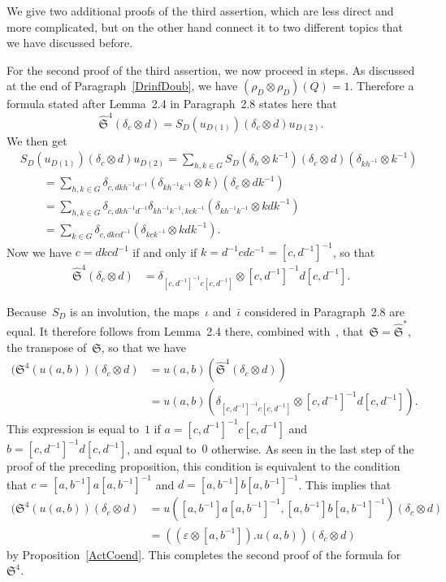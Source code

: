 \documentclass[12pt]{article}
\theoremstyle{definition}
\theoremstyle{break}
\newcommand{\fS}{\mathfrak{S}}
\newcommand{\hS}{\hat{\mathfrak{S}}}
\renewcommand{\1}{\mathbbm{1}}
\newcommand{\ot}{\mathbin{\otimes}}
\newcommand{\uu}{u}
\begin{document}
We give two additional proofs of the third assertion, which are less direct and more complicated, but on the other hand connect it to two different topics that we have discussed before.
\begin{parlist}
\item
For the second proof of the third assertion, we now proceed in steps. As discussed at the end of Paragraph~\ref{DrinfDoub}, we have $(\rho_D \ot \rho_D)(Q) = 1$. Therefore a formula stated after Lemma~2.4 in Paragraph~2.8 states here that
\[\hS^4(\delta_c \ot d) = S_D(u_{D (1)}) (\delta_c \ot d) u_{D (2)}.\]
We then get
\begin{align*}
&S_D(u_{D (1)}) (\delta_c \ot d) u_{D (2)}
= \sum_{h,k \in G} S_D(\delta_{h} \ot k^{-1}) (\delta_c \ot d) (\delta_{k h^{-1}} \ot k^{-1})  \\
&\qquad = \sum_{h,k \in G} \delta_{c, d k h^{-1} d^{-1}} (\delta_{k h^{-1} k^{-1}} \ot k) (\delta_{c} \ot d k^{-1}) \\
&\qquad = \sum_{h,k \in G} \delta_{c, d k h^{-1} d^{-1}} \delta_{k h^{-1} k^{-1}, k c k^{-1}}
(\delta_{k h^{-1} k^{-1}} \ot k d k^{-1}) \\
&\qquad = \sum_{k \in G} \delta_{c, d k c d^{-1}} (\delta_{k c k^{-1}} \ot k d k^{-1}).
\end{align*}
Now we have $c = d k c d^{-1}$ if and only if $k = d^{-1} c d c^{-1} = [c,d^{-1}]^{-1}$, so that
\begin{align*}
\hS^4(\delta_c \ot d)
&= \delta_{[c,d^{-1}]^{-1} c [c,d^{-1}]} \ot [c,d^{-1}]^{-1} d [c,d^{-1}].
\end{align*}

\item
Because~$S_D$ is an involution, the maps~$\iota$ and~$\bar{\iota}$ considered in Paragraph~2.8 are equal. It therefore follows from Lemma~2.4 there, combined with~\cite[Prop.~4.1, p.~35]{SZ}, that~$\fS = \hat{\fS}^*$, the transpose of~$\hat{\fS}$, so that we have
\begin{align*}
(\fS^4(\uu(a,b))(\delta_c \ot d) &= \uu(a,b)(\hat{\fS}^4(\delta_c \ot d)) \\
&= \uu(a,b)(\delta_{[c,d^{-1}]^{-1} c [c,d^{-1}]} \ot [c,d^{-1}]^{-1} d [c,d^{-1}]).
\end{align*}
This expression is equal to~$1$ if
$a = [c,d^{-1}]^{-1} c [c,d^{-1}]$ and $b = [c,d^{-1}]^{-1} d [c,d^{-1}]$, and equal to~$0$ otherwise. As seen in the last step of the proof of the preceding proposition, this condition is equivalent to the condition that
$c = [a, b^{-1}] a [a, b^{-1}]^{-1}$ and $d = [a, b^{-1}] b [a, b^{-1}]^{-1}$.
This implies that
\begin{align*}
(\fS^4(\uu(a,b))(\delta_c \ot d)
&= \uu([a, b^{-1}] a [a, b^{-1}]^{-1}, [a, b^{-1}] b [a, b^{-1}]^{-1})(\delta_{c} \ot d)\\
&= ((\varepsilon \ot [a, b^{-1}]). \uu(a,b))(\delta_{c} \ot d)
\end{align*}
by Proposition~\ref{ActCoend}. This completes the second proof of the formula for~$\fS^4$.


\end{parlist}
\end{document}
